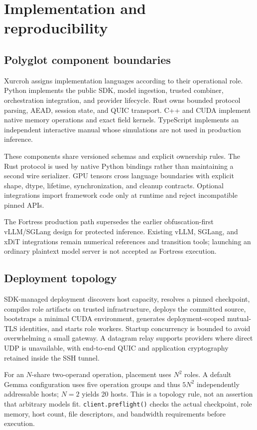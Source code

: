 \section{Implementation and reproducibility}\label{sec:implementation}

\subsection{Polyglot component boundaries}

Xurcroh assigns implementation languages according to their operational role. Python implements the public SDK, model ingestion, trusted combiner, orchestration integration, and provider lifecycle. Rust owns bounded protocol parsing, AEAD, session state, and QUIC transport. C++ and CUDA implement native memory operations and exact field kernels. TypeScript implements an independent interactive manual whose simulations are not used in production inference.

These components share versioned schemas and explicit ownership rules. The Rust protocol is used by native Python bindings rather than maintaining a second wire serializer. GPU tensors cross language boundaries with explicit shape, dtype, lifetime, synchronization, and cleanup contracts. Optional integrations import framework code only at runtime and reject incompatible pinned APIs.

The Fortress production path supersedes the earlier obfuscation-first vLLM/SGLang design for protected inference. Existing vLLM, SGLang, and xDiT integrations remain numerical references and transition tools; launching an ordinary plaintext model server is not accepted as Fortress execution.

\subsection{Deployment topology}

SDK-managed deployment discovers host capacity, resolves a pinned checkpoint, compiles role artifacts on trusted infrastructure, deploys the committed source, bootstraps a minimal CUDA environment, generates deployment-scoped mutual-TLS identities, and starts role workers. Startup concurrency is bounded to avoid overwhelming a small gateway. A datagram relay supports providers where direct UDP is unavailable, with end-to-end QUIC and application cryptography retained inside the SSH tunnel.

For an $N$-share two-operand operation, placement uses $N^2$ roles. A default Gemma configuration uses five operation groups and thus $5N^2$ independently addressable hosts; $N=2$ yields 20 hosts. This is a topology rule, not an assertion that arbitrary models fit. \texttt{client.preflight()} checks the actual checkpoint, role memory, host count, file descriptors, and bandwidth requirements before execution.

